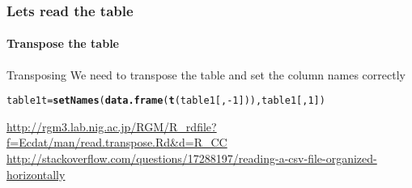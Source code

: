 \documentclass{article}\usepackage[]{graphicx}\usepackage[]{color}
\makeatletter
\newcommand{\hlnum}[1]{\textcolor[rgb]{0.686,0.059,0.569}{#1}}%
\newcommand{\hlopt}[1]{\textcolor[rgb]{0,0,0}{#1}}%
\newcommand{\hlstd}[1]{\textcolor[rgb]{0.345,0.345,0.345}{#1}}%
\newcommand{\hlkwb}[1]{\textcolor[rgb]{0.69,0.353,0.396}{#1}}%
\newcommand{\hlkwd}[1]{\textcolor[rgb]{0.737,0.353,0.396}{\textbf{#1}}}%
\newenvironment{kframe}{%
 \def\at@end@of@kframe{}%
 \ifinner\ifhmode%
  \def\at@end@of@kframe{\end{minipage}}%
  \begin{minipage}{\columnwidth}%
 \fi\fi%
 \def\FrameCommand##1{\hskip\@totalleftmargin \hskip-\fboxsep
 \colorbox{shadecolor}{##1}\hskip-\fboxsep
     \hskip-\linewidth \hskip-\@totalleftmargin \hskip\columnwidth}%
 \MakeFramed {\advance\hsize-\width
   \@totalleftmargin\z@ \linewidth\hsize
   \@setminipage}}%
 {\par\unskip\endMakeFramed%
 \at@end@of@kframe}
\newenvironment{knitrout}{}{} %
\makeatother
\begin{document}
\begin{frame}[fragile]
  \frametitle{Lets read the table}
  \framesubtitle{Transpose the table}
  \begin{block}{Transposing}
  We need to transpose the table and set the column names correctly
  \end{block}
\begin{knitrout}
\color{fgcolor}\begin{kframe}
\begin{alltt}
\hlstd{table1t}\hlkwb{=}\hlkwd{setNames}\hlstd{(}\hlkwd{data.frame}\hlstd{(}\hlkwd{t}\hlstd{(table1[,}\hlopt{-}\hlnum{1}\hlstd{])),table1[,}\hlnum{1}\hlstd{])}
\end{alltt}
\end{kframe}
\end{knitrout}
\url{http://rgm3.lab.nig.ac.jp/RGM/R_rdfile?f=Ecdat/man/read.transpose.Rd&d=R_CC}
\url{http://stackoverflow.com/questions/17288197/reading-a-csv-file-organized-horizontally}
\end{frame}
\end{document}
